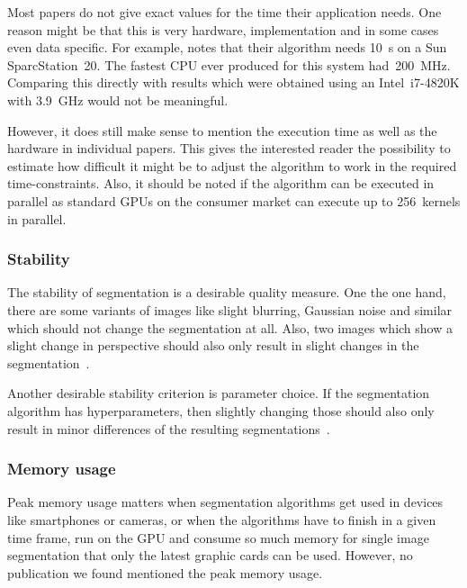 Most papers do not give exact values for the time their application needs. One
reason might be that this is very hardware, implementation and in some cases
even data specific. For example, \cite{hoover1996experimental} notes that their
algorithm needs \SI{10}{\second} on a Sun SparcStation~20. The fastest CPU ever
produced for this system had~\SI{200}{\mega\hertz}. Comparing this directly
with results which were obtained using an Intel~i7-4820K with
\SI{3.9}{\giga\hertz} would not be meaningful.

However, it does still make sense to mention the execution time as well as the
hardware in individual papers. This gives the interested reader the possibility
to estimate how difficult it might be to adjust the algorithm to work in the
required time-constraints. Also, it should be noted if the algorithm can be
executed in parallel as standard \glspl{GPU} on the consumer market can execute
up to 256~kernels in parallel.


\subsubsection{Stability}%
\label{subsubsec:stability-quality-measure}%
The stability of segmentation is a desirable quality measure. One the one hand,
there are some variants of images like slight blurring, Gaussian noise and
similar which should not change the segmentation at all. Also, two images which
show a slight change in perspective should also only result in slight changes
in the segmentation~\cite{pantofaru2005comparison}.

Another desirable stability criterion is parameter choice. If the
segmentation algorithm has hyperparameters, then slightly changing those should
also only result in minor differences of the resulting
segmentations~\cite{pantofaru2005comparison}.


\subsubsection{Memory usage}
Peak memory usage matters when segmentation algorithms get used in devices like
smartphones or cameras, or when the algorithms have to finish in a given time
frame, run on the \gls{GPU} and consume so much memory for single image
segmentation that only the latest graphic cards can be used. However, no
publication we found mentioned the peak memory usage.
